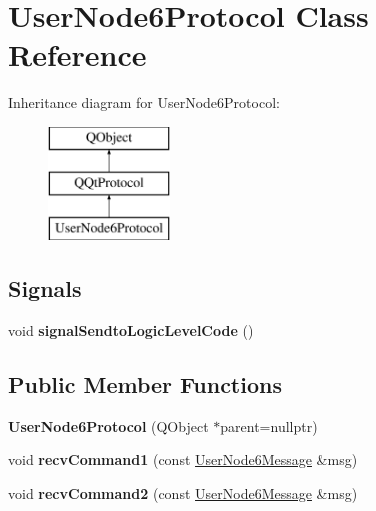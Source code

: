 \hypertarget{class_user_node6_protocol}{}\section{User\+Node6\+Protocol Class Reference}
\label{class_user_node6_protocol}
Inheritance diagram for User\+Node6\+Protocol\+:\begin{figure}[H]
\begin{center}
\leavevmode
\includegraphics[height=3.000000cm]{class_user_node6_protocol}
\end{center}
\end{figure}
\subsection*{Signals}
\begin{DoxyCompactItemize}
\item 
\mbox{\label{class_user_node6_protocol_afe51563c56cde02b89bea31390eaaf0a}} 
void {\bfseries signal\+Sendto\+Logic\+Level\+Code} ()
\end{DoxyCompactItemize}
\subsection*{Public Member Functions}
\begin{DoxyCompactItemize}
\item 
\mbox{\label{class_user_node6_protocol_a9885875d975222ea7cc6a7035c9f4251}} 
{\bfseries User\+Node6\+Protocol} (Q\+Object $\ast$parent=nullptr)
\item 
\mbox{\label{class_user_node6_protocol_a4b3cd85aa3c5a89ce3eef93080dcb3c6}} 
void {\bfseries recv\+Command1} (const \mbox{\hyperlink{class_user_node6_message}{User\+Node6\+Message}} \&msg)
\item 
\mbox{\label{class_user_node6_protocol_a846f78d36faf73e0348f0c82cb7b0bfd}} 
void {\bfseries recv\+Command2} (const \mbox{\hyperlink{class_user_node6_message}{User\+Node6\+Message}} \&msg)
\end{DoxyCompactItemize}
